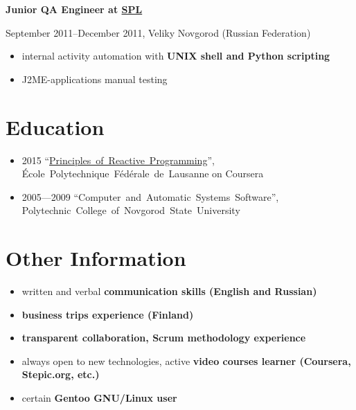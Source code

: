 \vspace{0.5cm}

{
\fontsize{12pt}{12pt}\selectfont
\bfseries Junior QA Engineer at
\href{http://spl.co}{\bfseries SPL\mdseries}
\mdseries
}

{
\fontsize{9pt}{8pt}\selectfont
September 2011--December 2011, Veliky Novgorod (Russian Federation)
}

\begin{itemize}[rightmargin=\dimexpr\linewidth-17cm-\leftmargin\relax]
    \setlength{\itemindent}{20pt}
    \item internal activity automation with \bfseries UNIX shell \mdseries and \bfseries Python \mdseries scripting
    \item J2ME-applications manual testing
\end{itemize}

\section*{Education}
\begin{itemize}
    \item 2015 ``\href{https://www.coursera.org/account/accomplishments/verify/UJJ99REEZY}{Principles~of~Reactive~Programming}'', École~Polytechnique~Fédérale~de~Lausanne on Coursera
    \item 2005---2009 ``Computer~and~Automatic~Systems~Software'', Polytechnic~College~of~Novgorod~State~University
\end{itemize}

\section*{Other Information}
\begin{itemize}
    \item written and verbal \bfseries communication skills \mdseries (English and Russian)
    \item \bfseries business trips \mdseries experience (Finland)
    \item \bfseries transparent \mdseries collaboration, \bfseries Scrum \mdseries methodology experience
    \item always open to new technologies, active \bfseries video courses \mdseries learner (Coursera, Stepic.org, etc.)
    \item certain \bfseries Gentoo \mdseries GNU/Linux user
\end{itemize}

